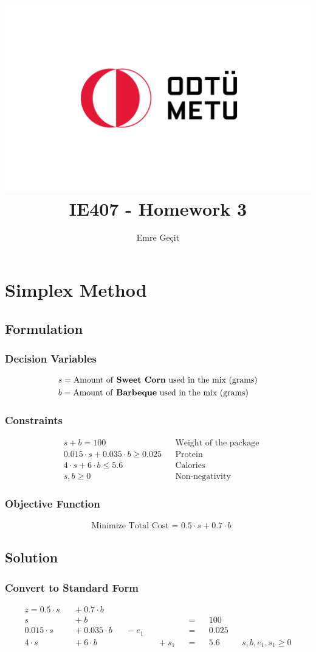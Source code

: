 \documentclass{article}
\author{Emre Geçit}
\title{\includegraphics{9.4.png}\\ IE407 - Homework 3}
\begin{document}
\maketitle

\newpage

\section{Simplex Method}

\subsection{Formulation}
\subsubsection*{Decision Variables}
\begin{align*}
    &s = \text{Amount of \textbf{Sweet Corn} used in the mix (grams)}\\
    &b = \text{Amount of \textbf{Barbeque} used in the mix (grams)}\\
\end{align*}

\subsubsection*{Constraints}
\begin{align*}
    &s + b = 100 && \text{Weight of the package}\\
    &0.015 \cdot s + 0.035 \cdot b \geq 0.025 && \text{Protein}\\
    &4 \cdot s + 6 \cdot b \leq 5.6 && \text{Calories}\\
    &s, b \geq 0 && \text{Non-negativity}
\end{align*}

\subsubsection*{Objective Function}
\begin{align*}
    &\text{Minimize Total Cost = } 0.5 \cdot s + 0.7 \cdot b
\end{align*}

\subsection{Solution}

\subsubsection{Convert to Standard Form}
\begin{align*}
    z = 0.5 \cdot s&&{}+ 0.7 \cdot b\\
    s&&{}+ b&& &&&&=&&100\\
    0.015 \cdot s&&{}+ 0.035 \cdot b&&{}- e_1&&&& = &&0.025\\
    4 \cdot s&&{}+ 6 \cdot b&&&&{}+ s_1&& = &&5.6\
    &&s, b, e_1, s_1 \geq 0
\end{align*}
\end{document}
